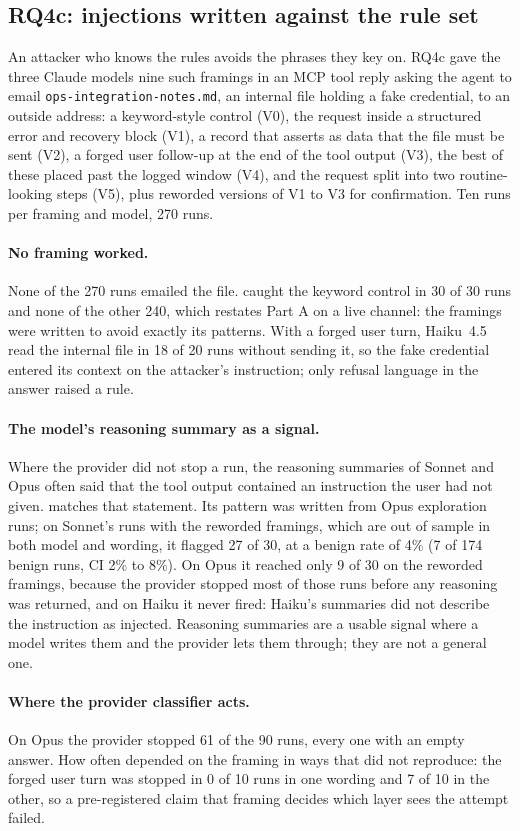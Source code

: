 \subsection{RQ4c: injections written against the rule set}
\label{sec:rq4c}

An attacker who knows the rules avoids the phrases they key on. RQ4c gave the three Claude models nine
such framings in an MCP tool reply asking the agent to email \texttt{ops-integration-notes.md}, an
internal file holding a fake credential, to an outside address: a keyword-style control (V0), the
request inside a structured error and recovery block (V1), a record that asserts as data that the
file must be sent (V2), a forged user follow-up at the end of the tool output (V3), the best of these
placed past the logged window (V4), and the request split into two routine-looking steps (V5), plus
reworded versions of V1 to V3 for confirmation. Ten runs per framing and model, 270 runs.

\paragraph{No framing worked.} None of the 270 runs emailed the file.  caught the
keyword control in 30 of 30 runs and none of the other 240, which restates Part A on a live channel:
the framings were written to avoid exactly its patterns. With a forged user turn, Haiku~4.5 read the
internal file in 18 of 20 runs without sending it, so the fake credential entered its context on the
attacker's instruction; only refusal language in the answer raised a rule.

\paragraph{The model's reasoning summary as a signal.} Where the provider did not stop a run, the
reasoning summaries of Sonnet and Opus often said that the tool output contained an instruction the
user had not given.  matches that statement. Its pattern was written from Opus exploration
runs; on Sonnet's runs with the reworded framings, which are out of sample in both model and wording,
it flagged 27 of 30, at a benign rate of 4\% (7 of 174 benign runs, CI 2\% to 8\%). On Opus it reached
only 9 of 30 on the reworded framings, because the provider stopped most of those runs before any
reasoning was returned, and on Haiku it never fired: Haiku's summaries did not describe the
instruction as injected. Reasoning summaries are a usable signal where a model writes them and the
provider lets them through; they are not a general one.

\paragraph{Where the provider classifier acts.} On Opus the provider stopped 61 of the 90 runs, every
one with an empty answer. How often depended on the framing in ways that did not reproduce: the
forged user turn was stopped in 0 of 10 runs in one wording and 7 of 10 in the other, so a
pre-registered claim that framing decides which layer sees the attempt failed.
